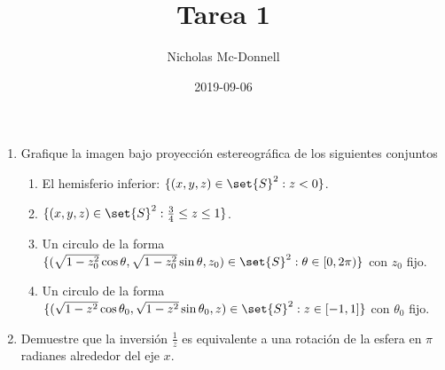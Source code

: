 \documentclass{homework}
\title{Tarea 1}
\date{2019-09-06}
\author{Nicholas Mc-Donnell}
\begin{document}
\maketitle
{}
\newpage
\tableofcontents
\newpage
{}
\begin{prob}
    \begin{enumerate}[label=(\alph*)]
        \item Grafique la imagen bajo proyección estereográfica de los siguientes conjuntos
              \begin{enumerate}[label=\roman*.]
                  \item El hemisferio inferior: \(\{(x,y,z)\in\set{S}^2:z<0\}\).
                  \item \(\{(x,y,z)\in\set{S}^2:\frac34\leq z\leq 1\}\).
                  \item Un circulo de la forma \(\{(\sqrt{1-z_0^2}\cos\theta,\sqrt{1-z_0^2}\sin\theta,z_0)\in\set{S}^2:\theta\in[0,2\pi)\}\) con \(z_0\) fijo.
                  \item Un circulo de la forma \(\{(\sqrt{1-z^2}\cos\theta_0,\sqrt{1-z^2}\sin\theta_0,z)\in\set{S}^2:z\in[-1,1]\}\) con \(\theta_0\) fijo.
              \end{enumerate}
        \item Demuestre que la inversión \(\frac1z\) es equivalente a una rotación de la esfera en \(\pi\) radianes alrededor del eje \(x\).
    \end{enumerate}
\end{prob}
\end{document}
